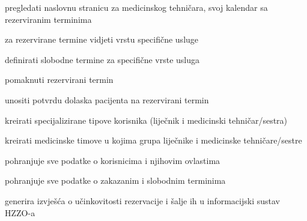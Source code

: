 \begin{packed_enum}
\begin{packed_enum}
				\end{packed_enum}
				
				\item  {}
				
				\begin{packed_enum}
					
					\item pregledati naslovnu stranicu za medicinskog tehničara, svoj kalendar sa rezerviranim terminima
					\item za rezervirane termine vidjeti vrstu specifične usluge
					\item definirati slobodne termine za specifične vrste usluga
					\item pomaknuti rezervirani termin
					\item unositi potvrdu dolaska pacijenta na rezervirani termin
					
				\end{packed_enum}
				
				\item  {}
				
				\begin{packed_enum}
					
					\item kreirati specijalizirane tipove korisnika (liječnik i medicinski tehničar/sestra)
					\item kreirati medicinske timove u kojima grupa liječnike i medicinske tehničare/sestre
					
				\end{packed_enum}
				
				\item  {}
				
				\begin{packed_enum}
					
					\item pohranjuje sve podatke o korisnicima i njihovim ovlastima
					\item pohranjuje sve podatke o zakazanim i slobodnim terminima
					
				\end{packed_enum}
				
				\item  {}
				
				\begin{packed_enum}
					
					\item generira izvješća o učinkovitosti rezervacije i šalje ih u informacijski sustav HZZO-a

				\end{packed_enum}
				
				
			\end{packed_enum}
			
